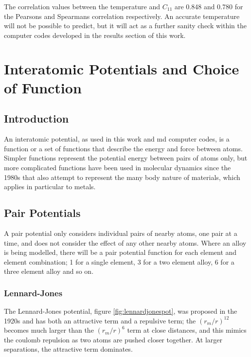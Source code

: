 The correlation values between the temperature and $C_{11}$ are 0.848 and 0.780 for the Pearsons and Spearmans correlation respectively.  An accurate temperature will not be possible to predict, but it will act as a further sanity check within the computer codes developed in the results section of this work.



\FloatBarrier
\section[Choice of Function]{Interatomic Potentials and Choice of Function}

\subsection{Introduction}

An interatomic potential, as used in this work and \acrshort{md} computer codes, is a function or a set of functions that describe the energy and force between atoms.  Simpler functions represent the potential energy between pairs of atoms only, but more complicated functions have been used in molecular dynamics since the 1980s that also attempt to represent the many body nature of materials, which applies in particular to metals.


\subsection{Pair Potentials}

A pair potential only considers individual pairs of nearby atoms, one pair at a time, and does not consider the effect of any other nearby atoms.  Where an alloy is being modelled, there will be a pair potential function for each element and element combination; 1 for a single element, 3 for a two element alloy, 6 for a three element alloy and so on.


\FloatBarrier
\subsubsection{Lennard-Jones}
\label{section:LennardJones}

The Lennard-Jones potential, figure \ref{fig:lennardjonespot}, was proposed in the 1920s and has both an attractive term and a repulsive term; the $(r_m/r)^{12}$ becomes much larger than the $(r_m/r)^6$ term at close distances, and this mimics the coulomb repulsion as two atoms are pushed closer together.  At larger separations, the attractive term dominates.

